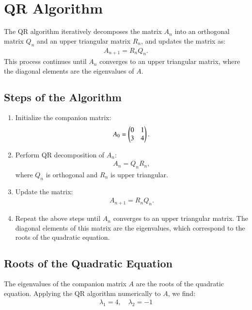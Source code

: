 \documentclass[journal]{IEEEtran}
\begin{document}
\section*{QR Algorithm}
The QR algorithm iteratively decomposes the matrix $A_n$ into an orthogonal matrix $Q_n$ and an upper triangular matrix $R_n$, and updates the matrix as:
\begin{align}
    A_{n+1} = R_n Q_n.
\end{align}
This process continues until $A_n$ converges to an upper triangular matrix, where the diagonal elements are the eigenvalues of $A$.

\subsection*{Steps of the Algorithm}
\begin{enumerate}
    \item Initialize the companion matrix:
    \begin{align}
        A_0 = 
        \begin{pmatrix}
            0 & 1 \\
            3 & 4
        \end{pmatrix}.
    \end{align}
    \item Perform QR decomposition of $A_n$:
    \begin{align}
        A_n = Q_n R_n,
    \end{align}
    where $Q_n$ is orthogonal and $R_n$ is upper triangular.
    \item Update the matrix:
    \begin{align}
        A_{n+1} = R_n Q_n.
    \end{align}
    \item Repeat the above steps until $A_n$ converges to an upper triangular matrix. The diagonal elements of this matrix are the eigenvalues, which correspond to the roots of the quadratic equation.
\end{enumerate}

\subsection*{Roots of the Quadratic Equation}
The eigenvalues of the companion matrix $A$ are the roots of the quadratic equation. Applying the QR algorithm numerically to $A$, we find:
\begin{align}
    \lambda_1 = 4, \quad \lambda_2 = -1
\end{align}
\end{document}
